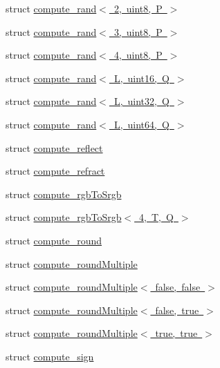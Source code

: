 \begin{DoxyCompactItemize}
\item 
struct \mbox{\hyperlink{structglm_1_1detail_1_1compute__rand_3_012_00_01uint8_00_01_p_01_4}{compute\+\_\+rand$<$ 2, uint8, P $>$}}
\item 
struct \mbox{\hyperlink{structglm_1_1detail_1_1compute__rand_3_013_00_01uint8_00_01_p_01_4}{compute\+\_\+rand$<$ 3, uint8, P $>$}}
\item 
struct \mbox{\hyperlink{structglm_1_1detail_1_1compute__rand_3_014_00_01uint8_00_01_p_01_4}{compute\+\_\+rand$<$ 4, uint8, P $>$}}
\item 
struct \mbox{\hyperlink{structglm_1_1detail_1_1compute__rand_3_01_l_00_01uint16_00_01_q_01_4}{compute\+\_\+rand$<$ L, uint16, Q $>$}}
\item 
struct \mbox{\hyperlink{structglm_1_1detail_1_1compute__rand_3_01_l_00_01uint32_00_01_q_01_4}{compute\+\_\+rand$<$ L, uint32, Q $>$}}
\item 
struct \mbox{\hyperlink{structglm_1_1detail_1_1compute__rand_3_01_l_00_01uint64_00_01_q_01_4}{compute\+\_\+rand$<$ L, uint64, Q $>$}}
\item 
struct \mbox{\hyperlink{structglm_1_1detail_1_1compute__reflect}{compute\+\_\+reflect}}
\item 
struct \mbox{\hyperlink{structglm_1_1detail_1_1compute__refract}{compute\+\_\+refract}}
\item 
struct \mbox{\hyperlink{structglm_1_1detail_1_1compute__rgb_to_srgb}{compute\+\_\+rgb\+To\+Srgb}}
\item 
struct \mbox{\hyperlink{structglm_1_1detail_1_1compute__rgb_to_srgb_3_014_00_01_t_00_01_q_01_4}{compute\+\_\+rgb\+To\+Srgb$<$ 4, T, Q $>$}}
\item 
struct \mbox{\hyperlink{structglm_1_1detail_1_1compute__round}{compute\+\_\+round}}
\item 
struct \mbox{\hyperlink{structglm_1_1detail_1_1compute__round_multiple}{compute\+\_\+round\+Multiple}}
\item 
struct \mbox{\hyperlink{structglm_1_1detail_1_1compute__round_multiple_3_01false_00_01false_01_4}{compute\+\_\+round\+Multiple$<$ false, false $>$}}
\item 
struct \mbox{\hyperlink{structglm_1_1detail_1_1compute__round_multiple_3_01false_00_01true_01_4}{compute\+\_\+round\+Multiple$<$ false, true $>$}}
\item 
struct \mbox{\hyperlink{structglm_1_1detail_1_1compute__round_multiple_3_01true_00_01true_01_4}{compute\+\_\+round\+Multiple$<$ true, true $>$}}
\item 
struct \mbox{\hyperlink{structglm_1_1detail_1_1compute__sign}{compute\+\_\+sign}}

\end{DoxyCompactItemize}
